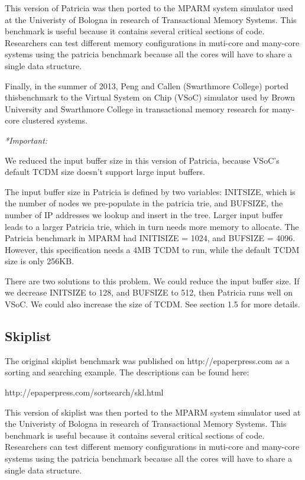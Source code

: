 \documentclass{article}
\begin{document}
This version of Patricia was then ported to the MPARM system simulator used at 
the Univeristy of Bologna in research of Transactional Memory Systems. This
benchmark is useful because it contains several critical sections of code. 
Researchers can test different memory configurations in muti-core and many-core 
systems using the patricia benchmark because all the cores will have to share a 
single data structure. 

Finally, in the summer of 2013, Peng and Callen (Swarthmore College) ported 
thisbenchmark to the Virtual System on Chip (VSoC) simulator used by Brown 
University and Swarthmore College in transactional memory research for 
many-core clustered systems. 

\vspace{2mm}
\emph{*Important:} 

We reduced the input buffer size in this version of Patricia, because VSoC's default TCDM size doesn't support large input buffers. 

The input buffer size in Patricia is defined by two variables: INITSIZE, which is the number of nodes we pre-populate in the patricia trie, and BUFSIZE, the number of IP addresses we lookup and insert in the tree. Larger input buffer leads to a larger Patricia trie, which in turn needs more memory to allocate. The Patricia benchmark in MPARM had INITISIZE = 1024, and BUFSIZE = 4096. However, this specification needs a 4MB TCDM to run, while the default TCDM size is only 256KB. 

There are two solutions to this problem. We could reduce the input buffer size. If we decrease INITSIZE to 128, and BUFSIZE to 512, then Patricia runs well on VSoC. We could also increase the size of TCDM. See section 1.5 for more details.

\subsection{Skiplist}

The original skiplist benchmark was published on http://epaperpress.com
as a sorting and searching example. The descriptions can be found here:

http://epaperpress.com/sortsearch/skl.html

This version of skiplist was then ported to the MPARM system simulator used at 
the Univeristy of Bologna in research of Transactional Memory Systems. This
benchmark is useful because it contains several critical sections of code. 
Researchers can test different memory configurations in muti-core and 
many-core systems using the patricia benchmark because all the cores will have 
to share a single data structure. 
\end{document}
